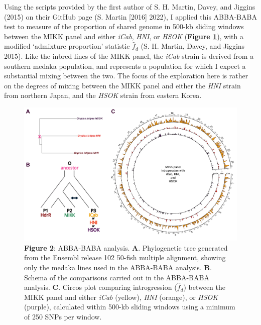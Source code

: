 \documentclass[
]{book}
\begin{document}
Using the scripts provided by the first author of S. H. Martin, Davey, and Jiggins (2015) on their GitHub page (S. Martin {[}2016{]} 2022), I applied this ABBA-BABA test to measure of the proportion of shared genome in 500-kb sliding windows between the MIKK panel and either \emph{iCab}, \emph{HNI}, or \emph{HSOK} (\textbf{Figure \ref{fig:ABBABABA}}), with a modified `admixture proportion' statistic \(\hat{f}_d\) (S. H. Martin, Davey, and Jiggins 2015). Like the inbred lines of the MIKK panel, the \emph{iCab} strain is derived from a southern medaka population, and represents a population for which I expect a substantial mixing between the two. The focus of the exploration here is rather on the degrees of mixing between the MIKK panel and either the \emph{HNI} strain from northern Japan, and the \emph{HSOK} strain from eastern Korea.



\begin{figure}
\includegraphics[width=1\linewidth]{figs/mikk_genome/07_introgression} \caption{\textbf{Figure 2}: ABBA-BABA analysis. \textbf{A}. Phylogenetic tree generated from the Ensembl release 102 50-fish multiple alignment, showing only the medaka lines used in the ABBA-BABA analysis. \textbf{B}. Schema of the comparisons carried out in the ABBA-BABA analysis. \textbf{C}. Circos plot comparing introgression (\(\hat{f}_d\)) between the MIKK panel and either \emph{iCab} (yellow), \emph{HNI} (orange), or \emph{HSOK} (purple), calculated within 500-kb sliding windows using a minimum of 250 SNPs per window.}\label{fig:ABBABABA}
\end{figure}
\end{document}
